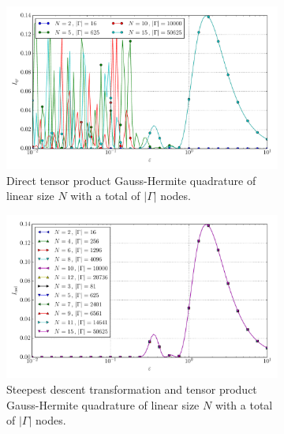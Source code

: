 \documentclass[a4paper,10pt]{article}
\begin{document}
\begin{figure}[ht!]
  \begin{subfigure}[t]{0.5\linewidth}
    \includegraphics[width=\linewidth]{./plots/tp_4d_conv_eps_(2,1,2,1)_(1,1,1,1)_val_qr.pdf}
    \caption{Direct tensor product Gauss-Hermite quadrature of linear size $N$ with a total of $|\Gamma|$ nodes.}
    \label{fig:tp_4d_conv_eps_2121_1111_val_qr}
  \end{subfigure}
  \begin{subfigure}[t]{0.5\linewidth}
    \includegraphics[width=\linewidth]{./plots/tp_4d_conv_eps_(2,1,2,1)_(1,1,1,1)_val_nsd.pdf}
    \caption{Steepest descent transformation and tensor product Gauss-Hermite quadrature of linear size $N$ with a total of $|\Gamma|$ nodes.}
    \label{fig:tp_4d_conv_eps_2121_1111_val_nsd}
  \end{subfigure} \\
  \begin{subfigure}[t]{0.5\linewidth}

\end{subfigure}
\end{figure}
\end{document}
